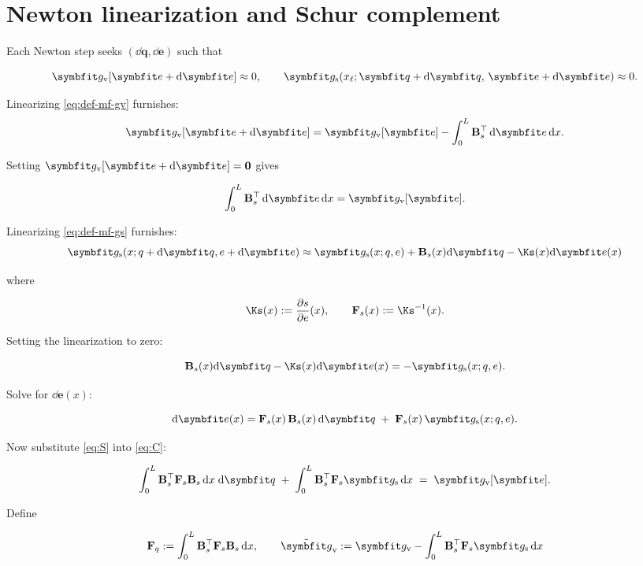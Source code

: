 
\section{Newton linearization and Schur complement}

Each Newton step seeks \((\dd \bm{q},\dd \bm{e})\) such that

\[
\residv[\bm{e}+\dd \bm{e}]\approx 0,\qquad \resids(x_{\ell};\bm{q}+\dd \bm{q},\,\bm{e}+\dd \bm{e})\approx 0.
\]

Linearizing \eqref{eq:def-mf-gv} furnishes:
\[
\residv[\bm{e}+\dd \bm{e}] = \residv[\bm{e}]-\int_0^L \ForceInterp^{\top}\,\dd \bm{e}\,\dd\reflenx.
\]

Setting \(\residv[\bm{e}+\dd \bm{e}]=\mathbf{0}\) gives

\begin{equation}
\int_0^L \ForceInterp^{\top}\,\dd \bm{e}\,\dd\reflenx = \residv[\bm{e}].
\label{eq:C}
\end{equation}

Linearizing \eqref{eq:def-mf-gs} furnishes:
\[
\resids(x;q+\dd \bm{q},e+\dd \bm{e})\approx \resids(x;q,e) + \ForceInterp(x)\dd \bm{q} - \Ks(x)\dd \bm{e}(x)
\]

where

\begin{equation}
\Ks(x):=\frac{\partial s}{\partial e}(x),\qquad \mathbf{F}_{s}(x):=\Ks^{-1}(x).
\label{eq:def-section-flexibility}
\end{equation}

Setting the linearization to zero:

\begin{equation}
\ForceInterp(x)\dd \bm{q} - \Ks(x)\dd \bm{e}(x) = -\resids(x;q,e).
\end{equation}

Solve for \(\dd \bm{e}(x)\):

\begin{equation}
\dd \bm{e}(x) = \mathbf{F}_{s}(x)\,\ForceInterp(x)\,\dd \bm{q} \;+\; \mathbf{F}_{s}(x)\,\resids(x;q,e).
\label{eq:S}
\end{equation}

Now substitute \eqref{eq:S} into \eqref{eq:C}:

\[
\int_0^L \ForceInterp^{\top} \mathbf{F}_{s} \ForceInterp\,\dd\reflenx\;\dd \bm{q} 
\;+\;\int_0^L \ForceInterp^{\top} \mathbf{F}_{s} \resids\,\dd\reflenx \;=\; \residv[\bm{e}].
\]

Define

\begin{equation}
\mathbf{F}_q := \int_0^L \ForceInterp^{\top} \mathbf{F}_{s} \ForceInterp\,\dd\reflenx,
\qquad
\tilde{\bm{g}}_{\rm v} := \residv - \int_0^L \ForceInterp^{\top} \mathbf{F}_{s} \resids\,\dd\reflenx
\label{eq:def-mv-flex}
\end{equation}

